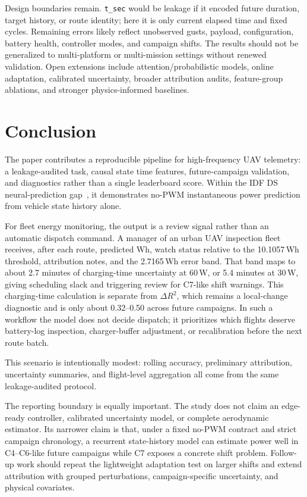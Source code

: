 \documentclass[runningheads,a4paper]{llncs}
\begin{document}
Design boundaries remain. \texttt{t\_sec} would be leakage if it encoded future duration, target history, or route identity; here it is only current elapsed time and fixed cycles. Remaining errors likely reflect unobserved gusts, payload, configuration, battery health, controller modes, and campaign shifts. The results should not be generalized to multi-platform or multi-mission settings without renewed validation. Open extensions include attention/probabilistic models, online adaptation, calibrated uncertainty, broader attribution audits, feature-group ablations, and stronger physics-informed baselines.

\section{Conclusion}

The paper contributes a reproducible pipeline for high-frequency UAV telemetry: a leakage-audited task, causal state time features, future-campaign validation, and diagnostics rather than a single leaderboard score. Within the IDF DS neural-prediction gap~\cite{garcia2026idfds}, it demonstrates no-PWM instantaneous power prediction from vehicle state history alone.

For fleet energy monitoring, the output is a review signal rather than an automatic dispatch command. A manager of an urban UAV inspection fleet receives, after each route, predicted Wh, watch status relative to the 10.1057\,Wh threshold, attribution notes, and the 2.7165\,Wh error band. That band maps to about 2.7 minutes of charging-time uncertainty at 60\,W, or 5.4 minutes at 30\,W, giving scheduling slack and triggering review for C7-like shift warnings. This charging-time calculation is separate from $\Delta R^2$, which remains a local-change diagnostic and is only about 0.32--0.50 across future campaigns. In such a workflow the model does not decide dispatch; it prioritizes which flights deserve battery-log inspection, charger-buffer adjustment, or recalibration before the next route batch.

This scenario is intentionally modest: rolling accuracy, preliminary attribution, uncertainty summaries, and flight-level aggregation all come from the same leakage-audited protocol.

The reporting boundary is equally important. The study does not claim an edge-ready controller, calibrated uncertainty model, or complete aerodynamic estimator. Its narrower claim is that, under a fixed no-PWM contract and strict campaign chronology, a recurrent state-history model can estimate power well in C4--C6-like future campaigns while C7 exposes a concrete shift problem. Follow-up work should repeat the lightweight adaptation test on larger shifts and extend attribution with grouped perturbations, campaign-specific uncertainty, and physical covariates.
\end{document}
